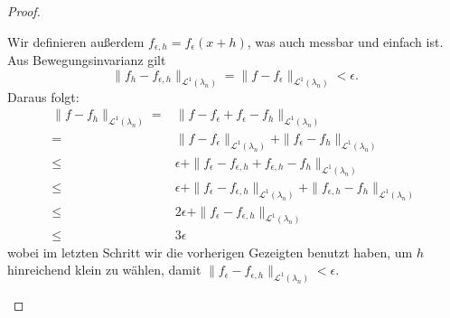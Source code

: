 \begin{proof}
\begin{parts}
	Wir definieren außerdem $f_{\epsilon,h}=f_\epsilon(x+h)$, was auch messbar und einfach ist. Aus Bewegungsinvarianz gilt
\[
	\|f_h-f_{\epsilon,h}\|_{\mathcal{L}^1(\lambda_n)}=\|f-f_\epsilon\|_{\mathcal{L}^1(\lambda_n)}<\epsilon
.\] 
	Daraus folgt:
	\begin{align*}
		\|f-f_h\|_{\mathcal{L}^1(\lambda_n)}=&\|f-f_\epsilon+f_\epsilon-f_h\|_{\mathcal{L}^1(\lambda_n)}\\
		=&\|f-f_\epsilon\|_{\mathcal{L}^1(\lambda_n)}+\|f_\epsilon-f_h\|_{\mathcal{L}^1(\lambda_n)}\\
		\le&\epsilon + \|f_\epsilon-f_{\epsilon,h}+f_{\epsilon,h}-f_h\|_{\mathcal{L}^1(\lambda_n)}\\
		\le&\epsilon+\|f_\epsilon-f_{\epsilon,h}\|_{\mathcal{L}^1(\lambda_n)}+\|f_{\epsilon,h}-f_h\|_{\mathcal{L}^1(\lambda_n)}\\
		\le&2\epsilon+\|f_\epsilon-f_{\epsilon,h}\|_{\mathcal{L}^1(\lambda_n)}\\
		\le&3\epsilon
	\end{align*}
	wobei im letzten Schritt wir die vorherigen Gezeigten benutzt haben, um $h$ hinreichend klein zu wählen, damit $\|f_\epsilon-f_{\epsilon,h}\|_{\mathcal{L}^1(\lambda_n)}<\epsilon$.\qedhere
	\end{parts}
\end{proof}
